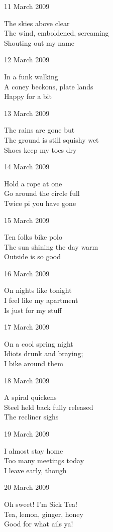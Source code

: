 \documentclass[12pt]{article}
\begin{document}
11 March 2009

The skies above clear \\
The wind, emboldened, screaming \\
Shouting out my name

12 March 2009

In a funk walking \\
A coney beckons, plate lands \\
Happy for a bit

13 March 2009

The rains are gone but \\
The ground is still squishy wet \\
Shoes keep my toes dry

14 March 2009

Hold a rope at one \\
Go around the circle full \\
Twice pi you have gone

\newpage

15 March 2009

Ten folks bike polo \\
The sun shining the day warm \\
Outside is so good

16 March 2009

On nights like tonight \\
I feel like my apartment \\
Is just for my stuff

17 March 2009

On a cool spring night \\
Idiots drunk and braying; \\
I bike around them

18 March 2009

A spiral quickens \\
Steel held back fully released \\
The recliner sighs

19 March 2009

I almost stay home \\
Too many meetings today \\
I leave early, though

20 March 2009

Oh sweet! I'm Sick Tea! \\
Tea, lemon, ginger, honey \\
Good for what ails ya!

\newpage
\end{document}
